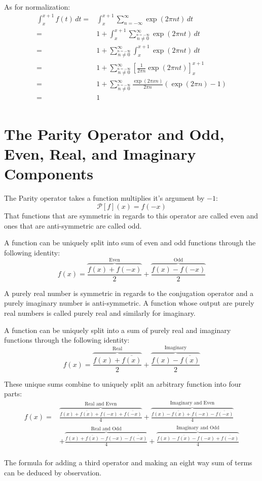 As for normalization:
\begin{equation*}
\begin{aligned}
\int_{x}^{x+1}f(t)\,dt =& \int_{x}^{x+1}\sum_{n=-\infty}^{\infty}\exp(2\pi n t)\,dt\\
=& 1+\int_{x}^{x+1}\sum_{\stackrel{n=-\infty}{n\neq 0}}^{\infty}\exp(2\pi n t)\,dt\\
=& 1+\sum_{\stackrel{n=-\infty}{n\neq 0}}^{\infty}\int_{x}^{x+1}\exp(2\pi n t)\,dt\\
=& 1+\sum_{\stackrel{n=-\infty}{n\neq 0}}^{\infty}\left[\frac{1}{2\pi n}\exp(2\pi n t)\right]_{x}^{x+1}\\
=& 1+\sum_{\stackrel{n=-\infty}{n\neq 0}}^{\infty}\frac{\exp(2\pi x n)}{2\pi n}(\exp(2\pi n)-1)\\
=& 1\\
\end{aligned}
\end{equation*}

\section{The Parity Operator and Odd, Even, Real, and Imaginary Components}
\label{appx:real-img-odd-even}
The Parity operator takes a function multiplies it's argument by $-1$:
\[\mathcal{P}[f](x) = f(-x)\]
That functions that are symmetric in regards to this operator are called even and ones that are anti-symmetric are called odd.

A function can be uniquely split into  sum of even and odd functions through the following identity:
\[ f(x) = \overbrace{\frac{f(x)+f(-x)}{2}}^\text{Even}+\overbrace{\frac{f(x)-f(-x)}{2}}^\text{Odd}\]

A purely real number is symmetric in regards to the conjugation operator and a purely imaginary number is anti-symmetric.
A function whose output are purely real numbers is called purely real and similarly for imaginary.

A function can be uniquely split into a sum of purely real and imaginary functions through the following identity:
\[ f(x) = \overbrace{\frac{f(x)+\overline{f(x)}}{2}}^\text{Real}+\overbrace{\frac{f(x)-\overline{f(x)}}{2}}^\text{Imaginary}\]

These unique sums combine to uniquely split an arbitrary function into four parts:
\begin{equation*}
\begin{aligned}
	 f(x) =& \overbrace{\frac{f(x)+\overline{f(x)}+f(-x) + \overline{f(-x)}}{4}}^\text{Real and Even}+\overbrace{\frac{f(x)-\overline{f(x)}+f(-x)-\overline{f(-x)}}{4}}^\text{Imaginary and Even} \\
	 &+ \overbrace{\frac{f(x)+\overline{f(x)}-f(-x) - \overline{f(-x)}}{4}}^\text{Real and Odd}+\overbrace{\frac{f(x)-\overline{f(x)}-f(-x)+\overline{f(-x)}}{4}}^\text{Imaginary and Odd}\\
\end{aligned}
\end{equation*}

The formula for adding a third operator and making an eight way sum of terms can be deduced by observation.

